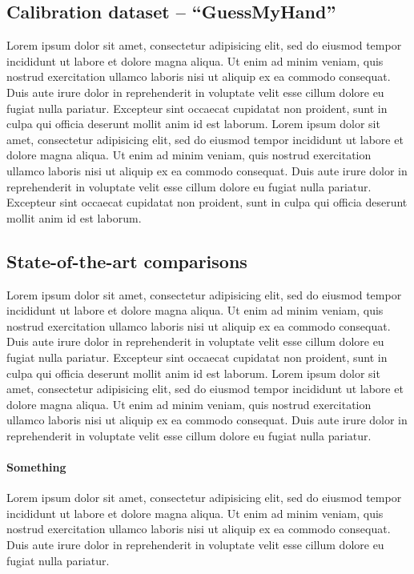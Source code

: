 
\subsection{Calibration dataset -- ``GuessMyHand''}
\label{sec:evaldataset}
\begin{DRAFT}
Lorem ipsum dolor sit amet, consectetur adipisicing elit, sed do eiusmod tempor incididunt ut labore et dolore magna aliqua. Ut enim ad minim veniam, quis nostrud exercitation ullamco laboris nisi ut aliquip ex ea commodo consequat. Duis aute irure dolor in reprehenderit in voluptate velit esse cillum dolore eu fugiat nulla pariatur. Excepteur sint occaecat cupidatat non proident, sunt in culpa qui officia deserunt mollit anim id est laborum.
Lorem ipsum dolor sit amet, consectetur adipisicing elit, sed do eiusmod tempor incididunt ut labore et dolore magna aliqua. Ut enim ad minim veniam, quis nostrud exercitation ullamco laboris nisi ut aliquip ex ea commodo consequat. Duis aute irure dolor in reprehenderit in voluptate velit esse cillum dolore eu fugiat nulla pariatur. Excepteur sint occaecat cupidatat non proident, sunt in culpa qui officia deserunt mollit anim id est laborum.
\end{DRAFT}


\subsection{State-of-the-art comparisons}
\begin{DRAFT}
Lorem ipsum dolor sit amet, consectetur adipisicing elit, sed do eiusmod tempor incididunt ut labore et dolore magna aliqua. Ut enim ad minim veniam, quis nostrud exercitation ullamco laboris nisi ut aliquip ex ea commodo consequat. Duis aute irure dolor in reprehenderit in voluptate velit esse cillum dolore eu fugiat nulla pariatur. Excepteur sint occaecat cupidatat non proident, sunt in culpa qui officia deserunt mollit anim id est laborum.
Lorem ipsum dolor sit amet, consectetur adipisicing elit, sed do eiusmod tempor incididunt ut labore et dolore magna aliqua. Ut enim ad minim veniam, quis nostrud exercitation ullamco laboris nisi ut aliquip ex ea commodo consequat. Duis aute irure dolor in reprehenderit in voluptate velit esse cillum dolore eu fugiat nulla pariatur.
\end{DRAFT}

\paragraph{Something}
\begin{DRAFT}
Lorem ipsum dolor sit amet, consectetur adipisicing elit, sed do eiusmod tempor incididunt ut labore et dolore magna aliqua. Ut enim ad minim veniam, quis nostrud exercitation ullamco laboris nisi ut aliquip ex ea commodo consequat. Duis aute irure dolor in reprehenderit in voluptate velit esse cillum dolore eu fugiat nulla pariatur.
\end{DRAFT}
